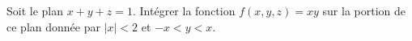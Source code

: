 
\begin{exercice}\label{exoOutilsMath-0139}

    Soit le plan \( x+y+z=1\). Intégrer la fonction \( f(x,y,z)=xy\) sur la portion de ce plan donnée par \( | x |<2\) et \( -x<y<x\).

\end{exercice}
